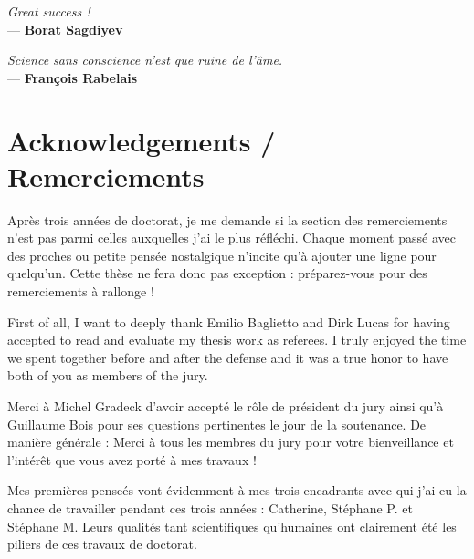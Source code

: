 

\begin{flushleft}{\slshape    
Great success !} \\ \medskip
--- \textbf{Borat Sagdiyev}
\end{flushleft}
\begin{flushright}{\slshape    
Science sans conscience n'est que ruine de l'âme.} \\ \medskip
--- \textbf{Fran\c{c}ois Rabelais}
\end{flushright}

\npar




\bigskip


\begingroup

\let\clearpage\relax
\let\cleardoublepage\relax
\let\cleardoublepage\relax

\chapter*{Acknowledgements / Remerciements}

Après trois années de doctorat, je me demande si la section des remerciements n'est pas parmi celles auxquelles j'ai le plus réfléchi. Chaque moment passé avec des proches ou petite pensée nostalgique n'incite qu'à ajouter une ligne pour quelqu'un. Cette thèse ne fera donc pas exception : préparez-vous pour des remerciements à rallonge ! 


\npar

First of all, I want to deeply thank Emilio Baglietto and Dirk Lucas for having accepted to read and evaluate my thesis work as referees. I truly enjoyed the time we spent together before and after the defense and it was a true honor to have both of you as members of the jury. 

Merci à Michel Gradeck d'avoir accepté le rôle de président du jury ainsi qu'à Guillaume Bois pour ses questions pertinentes le jour de la soutenance. De manière générale : Merci à tous les membres du jury pour votre bienveillance et l'intérêt que vous avez porté à mes travaux !

\npar

Mes premières penseés vont évidemment à mes trois encadrants avec qui j'ai eu la chance de travailler pendant ces trois années : Catherine, Stéphane P. et Stéphane M. Leurs qualités tant scientifiques qu'humaines ont clairement été les piliers de ces travaux de doctorat.

